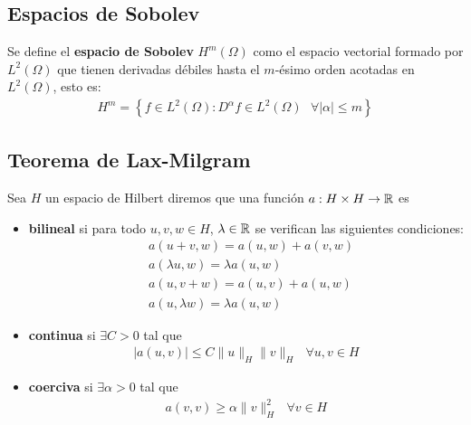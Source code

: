 \documentclass[12pt]{book}
\begin{document}
    \subsection{Espacios de Sobolev}

    \begin{definicion}
        Se define el \textbf{espacio de Sobolev} $H^m(\Omega)$ como el espacio vectorial formado por $L^2(\Omega)$ que tienen derivadas débiles hasta el $m$-ésimo orden acotadas en $L^2(\Omega)$, esto es:
        \begin{gather*}
            H^m = \left\{f\in L^2 (\Omega) :  D^\alpha f \in L^2(\Omega)\ \ \ \forall |\alpha| \leq m \right\}
        \end{gather*}
    \end{definicion}


    \subsection{Teorema de Lax-Milgram}

    \begin{definicion}
        Sea $H$ un espacio de Hilbert diremos que una función $a: H\times H \to \mathbb{R}$ es 
        \begin{itemize}
            \item \textbf{bilineal} si para todo $u,v,w\in H$, $\lambda \in \mathbb{R}$ se verifican las siguientes condiciones:
            \begin{align*}
                &a(u+v, w) = a(u, w) + a(v, w)\\
                &a(\lambda u, w) = \lambda a(u,w)\\
                &a(u, v+w) = a(u, v) + a(u, w)\\
                &a(u, \lambda w) = \lambda a(u,w)
            \end{align*}

            \item \textbf{continua} si $\exists C>0$ tal que 
            \begin{gather*}
                |a(u,v)| \leq C\|u\|_H\|v\|_H\ \ \ \forall u,v\in H
            \end{gather*}
            
            \item \textbf{coerciva} si $\exists \alpha >0$ tal que 
            \begin{gather*}
                a(v,v) \geq \alpha \|v\|^2_H\ \ \ \forall v \in H
            \end{gather*}
        \end{itemize}
    \end{definicion}
\end{document}
